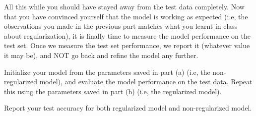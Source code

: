 \item {}
All this while you should have stayed away from the test data completely. Now that
you have convinced yourself that the model is working as expected (i.e, the
observations you made in the previous part matches what you learnt in class
about regularization), it is finally time to measure the model performance on
the test set. Once we measure the test set performance, we report it (whatever
value it may be), and NOT go back and refine the model any further.

Initialize your model from the parameters saved in part (a) (i.e, the non-regularized
model), and evaluate the model performance on the test data. Repeat this using the
parameters saved in part (b) (i.e, the regularized model).

Report your test accuracy for both regularized model and non-regularized model.

